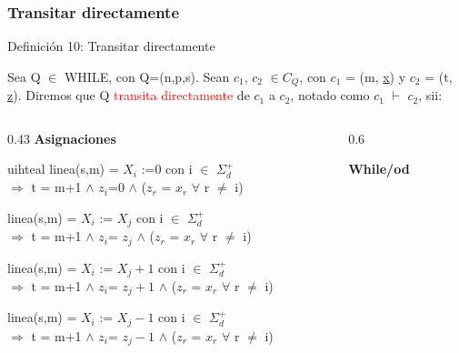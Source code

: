 \documentclass[xcolor=table]{beamer}
\begin{document}
\begin{frame}[fragile]\frametitle{Transitar directamente} \footnotesize  

\begin{block}{Definición 10: Transitar directamente}
\end{block}

Sea Q $\in$ WHILE, con Q=(n,p,s). Sean \underline{$c_1$}, \underline{$c_2$} $\in C_Q$, con \underline{$c_1$} = (m, \underline{x}) y  \underline{$c_2$} = (t, \underline{z}). Diremos que Q  \textcolor{red}{transita directamente} de   \underline{$c_1$}  a  \underline{$c_2$}, notado como  \underline{$c_1$} 
$\vdash$ \underline{$c_2$}, sii:\\

\begin{columns}
\begin{column}{0.43\textwidth}
\hspace{2cm}    \textbf{Asignaciones}
\begin{colorblock}[white]{uihteal}{}
linea(s,m) = $X_i$ :=0 con i $\in$ $\Sigma_d^+$\\
\hspace{0.5cm} $\Rightarrow$ t = m+1 $\wedge$ $z_i$=0 $\wedge$ ($z_r$ = $x_r$ $\forall$ r $\neq$ i) 

linea(s,m) = $X_i$ := $X_j$  con i $\in$ $\Sigma_d^+$\\
\hspace{0.5cm} $\Rightarrow$ t = m+1 $\wedge$ $z_i$= $z_j$ $\wedge$ ($z_r$ = $x_r$ $\forall$ r $\neq$ i) 

linea(s,m) = $X_i$ := $X_j+1$ con i $\in$ $\Sigma_d^+$\\
\hspace{0.5cm} $\Rightarrow$ t = m+1 $\wedge$ $z_i$= $z_j+1$ $\wedge$ ($z_r$ = $x_r$ $\forall$ r $\neq$ i) 

linea(s,m) = $X_i$ := $X_j-1$ con i $\in$ $\Sigma_d^+$\\
\hspace{0.5cm} $\Rightarrow$ t = m+1 $\wedge$ $z_i$= $z_j-1$ $\wedge$ ($z_r$ = $x_r$ $\forall$ r $\neq$ i) 
\end{colorblock}
\end{column}



\begin{column}{0.6\textwidth}

\begin{center}
    \textbf{While/od}
\end{center}


\end{column}
\end{columns}
\end{frame}
\end{document}
